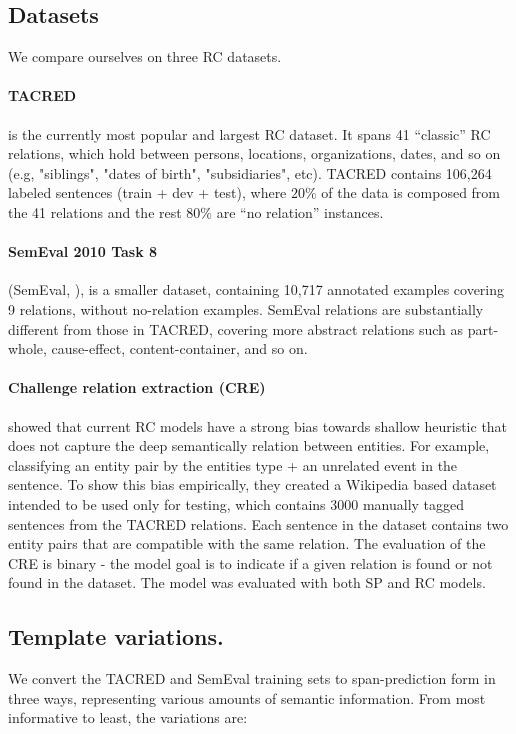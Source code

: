 \documentclass[11pt]{article}
\begin{document}
\subsection{Datasets}
We compare ourselves on three RC datasets.
\paragraph{TACRED} \cite{Zhang} is the currently most popular and largest RC dataset.
It spans 41 ``classic'' RC relations, which hold between persons, locations, organizations, dates, and so on (e.g, "siblings", "dates of birth", "subsidiaries", etc).
TACRED contains 106,264 labeled sentences (train + dev + test), where $20\%$ of the data is composed from the 41 relations and the rest $80\%$ are ``no relation'' instances. 
\paragraph{SemEval 2010 Task 8} (SemEval, \citet{Hendrickx2010}), is a smaller dataset, containing 10,717 annotated examples covering 9 relations, without no-relation examples.  
SemEval relations are substantially different from those in TACRED, covering more abstract relations such as part-whole, cause-effect, content-container, and so on.
\paragraph{Challenge relation extraction (CRE)} \citet{Rosenman2020} showed that current RC models have a strong bias towards shallow heuristic that does not capture the deep semantically relation between entities. For example, classifying an entity pair by the entities type + an unrelated event in the sentence. To show this bias empirically, they created a Wikipedia based dataset intended to be used only for testing, which contains 3000 manually tagged sentences from the TACRED relations. Each sentence in the dataset contains two entity pairs that are compatible with the same relation. The evaluation of the CRE is binary - the model goal is to indicate if a given relation is found or not found in the dataset. The model was evaluated with both SP and RC models.

\subsection{Template variations.} \label{ssec:supervised}

We convert the TACRED and SemEval training sets to span-prediction form in three ways, representing various amounts of semantic information. From most informative to least, the variations are: 
\end{document}
